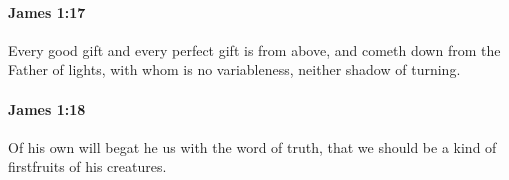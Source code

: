 		\paragraph{James 1:17} %
			\label{JAMES-1-17}

			Every good gift and every perfect gift is from above, and cometh down from the Father of lights, with whom is no variableness, neither shadow of turning.

			\begin{framed}
			\scriptsize
				\begin{compactdesc}
					\item[SBLG] 
				\end{compactdesc}
			\end{framed}

		\paragraph{James 1:18} %
			\label{JAMES-1-18}

			Of his own will begat he us with the word of truth, that we should be a kind of firstfruits of his creatures.

